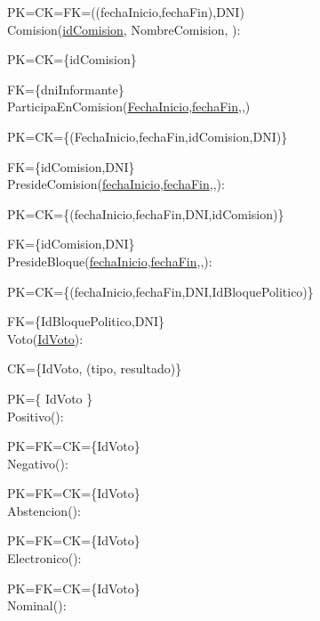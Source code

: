 PK=CK=FK=((fechaInicio,fechaFin),DNI)\\

Comision(\underline{idComision}, NombreComision, ):

PK=CK={\{idComision}\}

FK={\{dniInformante}\} \\

ParticipaEnComision(\underline{FechaInicio},\underline{fechaFin},\underline{},\underline{})

PK=CK={\{(FechaInicio,fechaFin,idComision,DNI)}\}

FK={\{idComision,DNI}\}\\

PresideComision(\underline{fechaInicio},\underline{fechaFin},\underline{},\underline{}):

PK=CK={\{(fechaInicio,fechaFin,DNI,idComision)}\}

FK={\{idComision,DNI}\}\\

PresideBloque(\underline{fechaInicio},\underline{fechaFin},\underline{},\underline{}):

PK=CK={\{(fechaInicio,fechaFin,DNI,IdBloquePolitico)}\}

FK={\{IdBloquePolitico,DNI}\}\\

Voto(\underline{IdVoto}):

CK={\{IdVoto, (tipo, resultado)}\}

PK={\{ IdVoto }\} \\

Positivo(\underline{}):

PK=FK=CK={\{IdVoto}\}\\

Negativo(\underline{}):

PK=FK=CK={\{IdVoto}\}\\

Abstencion(\underline{}):

PK=FK=CK={\{IdVoto}\}\\

Electronico(\underline{}):

PK=FK=CK={\{IdVoto}\}\\

Nominal(\underline{}):

